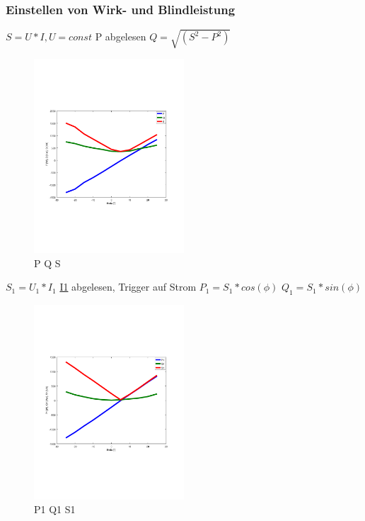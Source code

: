 \subsubsection{Einstellen von Wirk- und Blindleistung}


$S = U*I, U=const$
P abgelesen
$Q = \sqrt{(S^2 - P^2)}$
\begin{figure}[!ht]
  \begin{center}
  \includegraphics[width=0.5\textwidth, trim={1cm 6.5cm 2cm 7cm},clip]{pic/6_1_grundfrequenztaktung/6_1_2_einst_wirk_und_blindleistung/P_Q_S.pdf}
  \caption{P Q S}
  \label{fig:6_1_2_0}
  \end{center}
\end{figure}



$S_1 = U_1 * I_1$
\underline{I1} abgelesen, Trigger auf Strom
$P_1 = S_1 * cos(\phi)$
$Q_1 = S_1 * sin(\phi)$
\begin{figure}[!ht]
  \begin{center}
  \includegraphics[width=0.5\textwidth, trim={1cm 6.5cm 2cm 7cm},clip]{pic/6_1_grundfrequenztaktung/6_1_2_einst_wirk_und_blindleistung/P1_Q1_S1.pdf}
  \caption{P1 Q1 S1}
  \label{fig:6_1_2_1}
  \end{center}
\end{figure}


